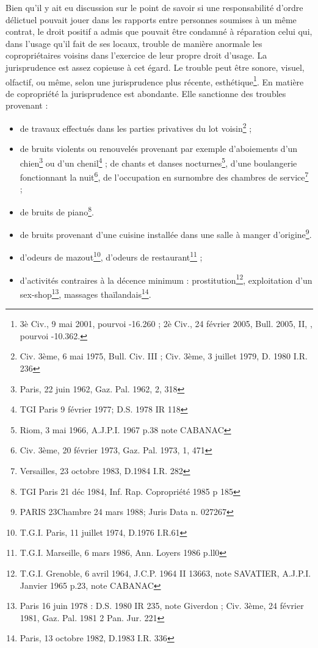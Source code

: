 			Bien qu'il y ait eu discussion sur le point de savoir si une responsabilité d'ordre délictuel pouvait jouer dans les rapports entre personnes soumises à un même contrat, le droit positif a admis que pouvait être condamné à réparation celui qui, dans l'usage qu'il fait de ses locaux, trouble de manière anormale les copropriétaires voisins dans l'exercice de leur propre droit d'usage. La jurisprudence est assez copieuse à cet égard. Le trouble peut être sonore, visuel, olfactif, ou même, selon une jurisprudence plus récente, esthétique\footnote{3è Civ., 9 mai 2001, pourvoi -16.260 ; 2è Civ., 24 février 2005, Bull. 2005, II, , pourvoi -10.362.}. En matière de copropriété la jurisprudence est abondante. Elle sanctionne des troubles provenant :
			\begin{itemize}
				\item de travaux effectués dans les parties privatives du lot voisin\footnote{Civ. 3ème, 6 mai 1975, Bull. Civ. III ; Civ. 3ème, 3 juillet 1979, D. 1980 I.R. 236} ;
				\item de bruits violents ou renouvelés provenant par exemple d'aboiements d'un chien\footnote{Paris, 22 juin 1962, Gaz. Pal. 1962, 2, 318} ou d'un chenil\footnote{TGI Paris 9 février 1977; D.S. 1978 IR 118} ; de chants et danses nocturnes\footnote{Riom, 3 mai 1966, A.J.P.I. 1967 p.38 note CABANAC}, d'une boulangerie fonctionnant la nuit\footnote{Civ. 3ème, 20 février 1973, Gaz. Pal. 1973, 1, 471}, de l'occupation en surnombre des chambres de service\footnote{Versailles, 23 octobre 1983, D.1984 I.R. 282} ;
				\item de bruits de piano\footnote{TGI Paris 21 déc 1984, Inf. Rap. Copropriété 1985 p 185}.
				\item de bruits provenant d'une cuisine installée dans une salle à manger d'origine\footnote{PARIS 23\degres Chambre 24 mars 1988; Juris Data n. 027267}.
				\item d'odeurs de mazout\footnote{T.G.I. Paris, 11 juillet 1974, D.1976 I.R.61}, d'odeurs de restaurant\footnote{T.G.I. Marseille, 6 mars 1986, Ann. Loyers 1986 p.ll0 } ;
				\item d'activités contraires à la décence minimum : prostitution\footnote{T.G.I. Grenoble, 6 avril 1964, J.C.P. 1964 II 13663, note SAVATIER, A.J.P.I. Janvier 1965 p.23, note CABANAC }, exploitation d'un sex-shop\footnote{Paris 16 juin 1978 : D.S. 1980 IR 235, note Giverdon ; Civ. 3ème, 24 février 1981, Gaz. Pal. 1981 2 Pan. Jur. 221 }, massages thaïlandais\footnote{Paris, 13 octobre 1982, D.1983 I.R. 336}.
			\end{itemize}
	
